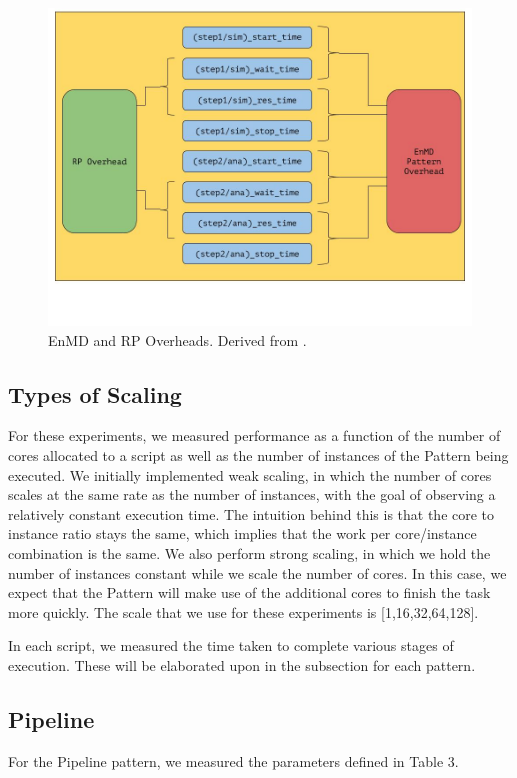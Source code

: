 \documentclass[]{article}
\begin{document}
		\begin{figure}[H]
			\centering
			\includegraphics[scale=.3]{diagrams/pattern_and_rp_overheads.jpg}
			\caption{EnMD and RP Overheads. Derived from \cite{rp_state_diagram}.}
			\label{fig:pattern_rp_overheads}
		\end{figure}

	\subsection{Types of Scaling}
		For these experiments, we measured performance as a function of the number of cores allocated to a script as well as the number of instances of the Pattern being executed. We initially implemented weak scaling, in which the number of cores scales at the same rate as the number of instances, with the goal of observing a relatively constant execution time. The intuition behind this is that the core to instance ratio stays the same, which implies that the work per core/instance combination is the same. We also perform strong scaling, in which we hold the number of instances constant while we scale the number of cores. In this case, we expect that the Pattern will make use of the additional cores to finish the task more quickly. The scale that we use for these experiments is [1,16,32,64,128].

		In each script, we measured the time taken to complete various stages of execution. These will be elaborated upon in the subsection for each pattern.

	\subsection{Pipeline}
		For the Pipeline pattern, we measured the parameters defined in Table 3. 
\end{document}
